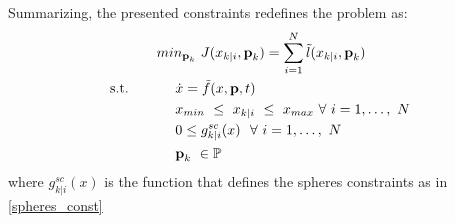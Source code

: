 Summarizing, the presented constraints redefines the problem as:
\begin{equation} 
	\begin{split}
			& min_{\textbf{p}_k}\ J({x}_{k|i},\textbf{p}_k) = \sum_{i=1}^{N}\tilde{l}({x}_{k|i},\textbf{p}_k) \\
			\textnormal{s.t.}\qquad
			&\ \ \ \ \dot{{x}}=\tilde{f}({x},\textbf{p},t) \\
			&\ \ \ \ {x}_{min}\ \leq\ x_{k|i}\ \leq\ {x}_{max}\  \forall\ i=1,\dots,\ N  \\
			&\ \ \ \ 0 \leq g^{sc}_{k|i}(x)\ \ \forall\ i=1,\dots,\ N \\
			&\ \ \ \ \textbf{p}_k\   \in \mathbb{P}\ \\
	\end{split}	
	\label{ourproblem_param_vinc}
\end{equation}
where $g^{sc}_{k|i}(x)$ is the function that defines the spheres constraints as in \ref{spheres_const}

